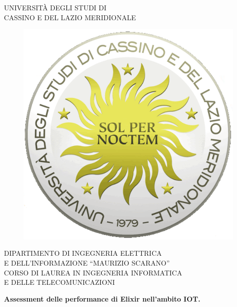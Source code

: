 
\thispagestyle{empty}

\begin{center}
    \Large{UNIVERSITÀ DEGLI STUDI DI \\ CASSINO E DEL LAZIO MERIDIONALE}
\end{center}

\begin{figure}[!htp]
    \centering
    \includegraphics[keepaspectratio=true,scale=0.25]{images/Frontespizio/Unicas_logo.pdf}
\end{figure}

\begin{center}
    \normalsize{DIPARTIMENTO DI INGEGNERIA ELETTRICA \\ E DELL'INFORMAZIONE “MAURIZIO SCARANO”}
    \vspace{4mm}
    \\ \normalsize{CORSO DI LAUREA IN INGEGNERIA INFORMATICA \\ E DELLE TELECOMUNICAZIONI}
\end{center}


\vspace{7mm}


\begin{center}
    \LARGE{\textbf{ Assessment delle performance di Elixir nell'ambito IOT.\\ }}
\end{center}


